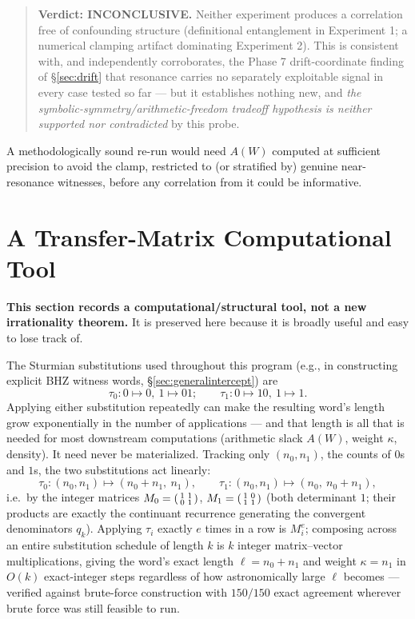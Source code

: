 \documentclass[11pt]{article}
\begin{document}
\begin{quote}
\textbf{Verdict: INCONCLUSIVE.} Neither experiment produces a correlation free of confounding structure (definitional entanglement in Experiment 1; a numerical clamping artifact dominating Experiment 2). This is consistent with, and independently corroborates, the Phase 7 drift-coordinate finding of \S\ref{sec:drift} that resonance carries no separately exploitable signal in every case tested so far --- but it establishes nothing new, and \emph{the symbolic-symmetry/arithmetic-freedom tradeoff hypothesis is neither supported nor contradicted} by this probe.
\end{quote}

A methodologically sound re-run would need $A(W)$ computed at sufficient precision to avoid the clamp, restricted to (or stratified by) genuine near-resonance witnesses, before any correlation from it could be informative.

\section{A Transfer-Matrix Computational Tool}
\label{sec:transfermatrix}

\textbf{This section records a computational/structural tool, not a new irrationality theorem.} It is preserved here because it is broadly useful and easy to lose track of.

The Sturmian substitutions used throughout this program (e.g., in constructing explicit BHZ witness words, \S\ref{sec:generalintercept}) are
\[
\tau_0: 0\mapsto 0,\ 1\mapsto 01; \qquad \tau_1: 0\mapsto 10,\ 1\mapsto 1.
\]
Applying either substitution repeatedly can make the resulting word's length grow exponentially in the number of applications --- and that length is all that is needed for most downstream computations (arithmetic slack $A(W)$, weight $\kappa$, density). It need never be materialized. Tracking only $(n_0,n_1)$, the counts of $0$s and $1$s, the two substitutions act linearly:
\[
\tau_0: (n_0,n_1)\mapsto(n_0+n_1,\ n_1), \qquad
\tau_1: (n_0,n_1)\mapsto(n_0,\ n_0+n_1),
\]
i.e.\ by the integer matrices $M_0=\begin{psmallmatrix}1&1\\0&1\end{psmallmatrix}$, $M_1=\begin{psmallmatrix}1&0\\1&1\end{psmallmatrix}$ (both determinant $1$; their products are exactly the continuant recurrence generating the convergent denominators $q_k$). Applying $\tau_i$ exactly $e$ times in a row is $M_i^e$; composing across an entire substitution schedule of length $k$ is $k$ integer matrix--vector multiplications, giving the word's exact length $\ell=n_0+n_1$ and weight $\kappa=n_1$ in $O(k)$ exact-integer steps regardless of how astronomically large $\ell$ becomes --- verified against brute-force construction with $150/150$ exact agreement wherever brute force was still feasible to run.
\end{document}
